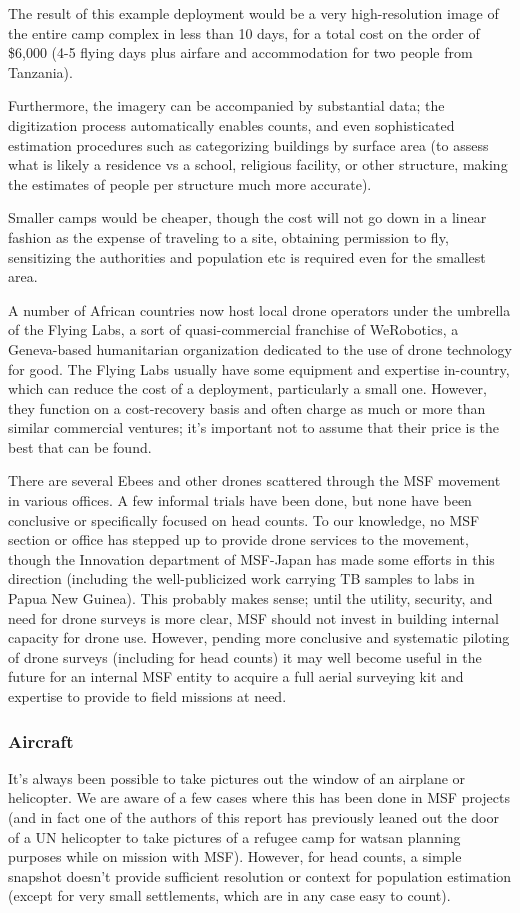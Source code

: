 \documentclass[a4paper,12pt,twoside]{article}
\begin{document}
The result of this example deployment would be a very high-resolution image of the entire camp complex in less than 10 days, for a total cost on the order of \$6,000 (4-5 flying days plus airfare and accommodation for two people from Tanzania). 

Furthermore, the imagery can be accompanied by substantial data; the digitization process automatically enables counts, and even sophisticated estimation procedures such as categorizing buildings by surface area (to assess what is likely a residence vs a school, religious facility, or other structure, making the estimates of people per structure much more accurate). 

Smaller camps would be cheaper, though the cost will not go down in a linear fashion as the expense of traveling to a site, obtaining permission to fly, sensitizing the authorities and population etc is required even for the smallest area. 

A number of African countries now host local drone operators under the umbrella of the Flying Labs, a sort of quasi-commercial franchise of WeRobotics, a Geneva-based humanitarian organization dedicated to the use of drone technology for good. The Flying Labs usually have some equipment and expertise in-country, which can reduce the cost of a deployment, particularly a small one. However, they function on a cost-recovery basis and often charge as much or more than similar commercial ventures; it's important not to assume that their price is the best that can be found.

There are several Ebees and other drones scattered through the MSF movement in various offices. A few informal trials have been done, but none have been conclusive or specifically focused on head counts. To our knowledge, no MSF section or office has stepped up to provide drone services to the movement, though the Innovation department of MSF-Japan has made some efforts in this direction (including the well-publicized work carrying TB samples to labs in Papua New Guinea). This probably makes sense; until the utility, security, and need for drone surveys is more clear, MSF should not invest in building internal capacity for drone use. However, pending more conclusive and systematic piloting of drone surveys (including for head counts) it may well become useful in the future for an internal MSF entity to acquire a full aerial surveying kit and expertise to provide to field missions at need. 

\subsubsection{Aircraft}
It's always been possible to take pictures out the window of an airplane or helicopter. We are aware of a few cases where this has been done in MSF projects (and in fact one of the authors of this report has previously leaned out the door of a UN helicopter to take pictures of a refugee camp for watsan planning purposes while on mission with MSF). However, for head counts, a simple snapshot doesn't provide sufficient resolution or context for population estimation (except for very small settlements, which are in any case easy to count).  
\end{document}
